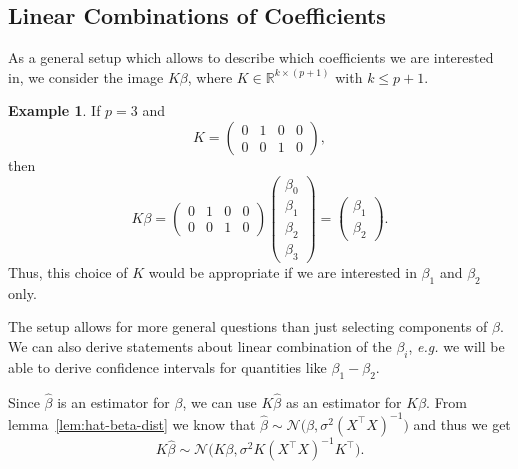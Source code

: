 \documentclass[
  a4paper,
]{article}
\theoremstyle{definition}
\theoremstyle{definition}
\newtheorem{example}{Example}[section]
\theoremstyle{definition}
\theoremstyle{definition}
\theoremstyle{remark}
\begin{document}
\subsection{Linear Combinations of Coefficients}\label{sec:simult-dist}

As a general setup which allows to describe which coefficients we are
interested in, we consider the image \(K\beta\), where \(K \in \mathbb{R}^{k \times
(p+1)}\) with \(k \leq p+1\).

\begin{example}
If \(p = 3\) and
\begin{equation*}
  K = \begin{pmatrix}
    0 & 1 & 0 & 0 \\
    0 & 0 & 1 & 0
  \end{pmatrix},
\end{equation*}
then
\begin{equation*}
  K\beta
  = \begin{pmatrix}
      0 & 1 & 0 & 0 \\
      0 & 0 & 1 & 0
    \end{pmatrix} \begin{pmatrix}
      \beta_0 \\ \beta_1 \\ \beta_2 \\ \beta_3
    \end{pmatrix}
  = \begin{pmatrix}
      \beta_1 \\ \beta_2
    \end{pmatrix}.
\end{equation*}
Thus, this choice of \(K\) would be appropriate if we are interested
in \(\beta_1\) and \(\beta_2\) only.
\end{example}

The setup allows for more general questions than just selecting components
of \(\beta\). We can also derive statements about linear combination of
the \(\beta_i\), \emph{e.g.} we will be able to derive confidence intervals
for quantities like \(\beta_1 - \beta_2\).

Since \(\hat\beta\) is an estimator for \(\beta\), we can use \(K\hat\beta\) as an
estimator for \(K\beta\). From lemma~\ref{lem:hat-beta-dist} we know that
\(\hat\beta \sim \mathcal{N}\bigl( \beta, \sigma^2 (X^\top X)^{-1} \bigr)\) and thus
we get
\begin{equation*}
  K\hat\beta
  \sim \mathcal{N}\bigl( K \beta, \sigma^2 K (X^\top X)^{-1} K^\top \bigr).
\end{equation*}
\end{document}
